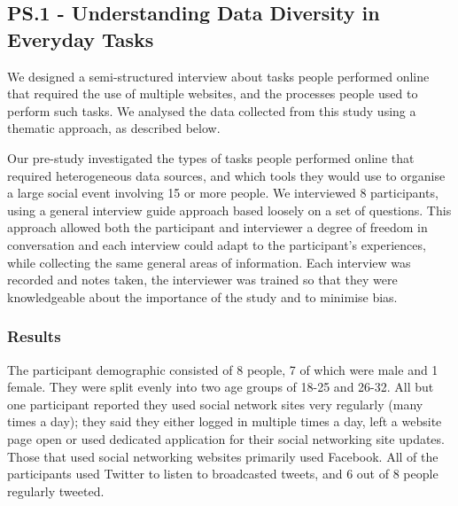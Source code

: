 \documentclass{sigchi}
\begin{document}
\subsection{PS.1 - Understanding Data Diversity in Everyday Tasks}
We designed a semi-structured interview about tasks people performed online that required the use of multiple websites, and the processes people used to perform such tasks.  We analysed the data collected from this study using a thematic approach, as described below. 

Our pre-study investigated the types of tasks people performed online that required heterogeneous data sources, and which tools they would use to organise a large social event involving 15 or more people.  We interviewed 8 participants, using a general interview guide approach based loosely on a set of questions.  This approach allowed both the participant and interviewer a degree of freedom in conversation and each interview could adapt to the participant's experiences, while collecting the same general areas of information.  Each interview was recorded and notes taken, the interviewer was trained so that they were knowledgeable about the importance of the study and to minimise bias.

\subsubsection{Results}
The participant demographic consisted of 8 people, 7 of which were male and 1 female.  They were split evenly into two age groups of 18-25 and 26-32.  All but one participant reported they used social network sites very regularly (many times a day); they said they either logged in multiple times a day, left a website page open or used dedicated application for their social networking site updates.  Those that used social networking websites primarily used Facebook.  All of the participants used Twitter to listen to broadcasted tweets, and 6 out of 8 people regularly tweeted. 
\end{document}
